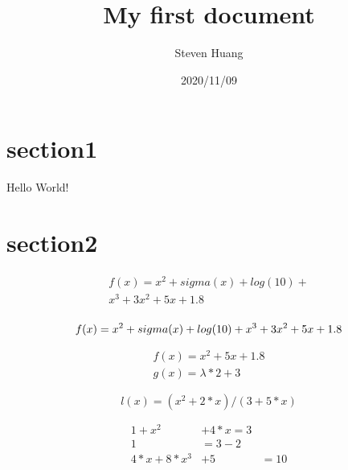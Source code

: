 \documentclass{article}
\title{ My first document}
\date{2020/11/09}
\author{Steven Huang}
\begin{document}
\maketitle
\newpage
{}

\section{section1}
Hello World!

\section{section2}

\begin{equation}\label{1}
\begin{aligned}
f(x)=x^2 + sigma(x) + log(10) +\\ x^3 + 3x^2 + 5x + 1.8\\
\end{aligned}
\end{equation}


\begin{equation}
f(x)=x^2 + sigma(x) + log(10) + x^3 + 3x^2 + 5x + 1.8\\
\end{equation}

\begin{align}
f(x)=x^2 + 5x + 1.8\\
g(x)=\lambda*2+3
\end{align}

\begin{equation}
l(x)=(x^2 + 2*x)/(3+5*x)
\end{equation}

\begin{align}
  1 + x^2 & + 4*x= 3\\
  1 &= 3 - 2\\
  4*x+8*x^3 &+5&=10
\end{align}
\end{document}

